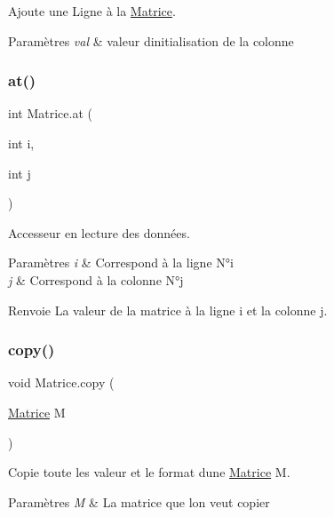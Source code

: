 Ajoute une Ligne à la \hyperlink{class_matrice}{Matrice}. 


\begin{DoxyParams}{Paramètres}
{\em val} & valeur d\textquotesingle{}initialisation de la colonne \\
\hline
\end{DoxyParams}
\mbox{\label{class_matrice_ad735382f0606ee683c761402af6f5a78}} 
\subsubsection{\texorpdfstring{at()}{at()}}
{\footnotesize\ttfamily int Matrice.\+at (\begin{DoxyParamCaption}\item[{int}]{i,  }\item[{int}]{j }\end{DoxyParamCaption})}



Accesseur en lecture des données. 


\begin{DoxyParams}{Paramètres}
{\em i} & Correspond à la ligne N°i \\
\hline
{\em j} & Correspond à la colonne N°j \\
\hline
\end{DoxyParams}
\begin{DoxyReturn}{Renvoie}
La valeur de la matrice à la ligne i et la colonne j. 
\end{DoxyReturn}
\mbox{\label{class_matrice_a61f65eda2c1f1853e8f72cd25de54776}} 
\subsubsection{\texorpdfstring{copy()}{copy()}}
{\footnotesize\ttfamily void Matrice.\+copy (\begin{DoxyParamCaption}\item[{\hyperlink{class_matrice}{Matrice}}]{M }\end{DoxyParamCaption})}



Copie toute les valeur et le format d\textquotesingle{}une \hyperlink{class_matrice}{Matrice} M. 


\begin{DoxyParams}{Paramètres}
{\em M} & La matrice que l\textquotesingle{}on veut copier \\
\hline
\end{DoxyParams}
\mbox{\label{class_matrice_a40c26a2a701faf2b1680886a8aeeadaf}} 
